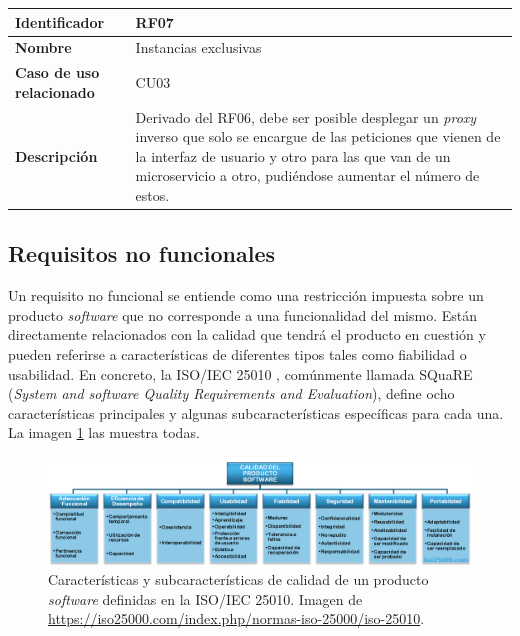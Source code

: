 \documentclass[11pt,spanish,listoffigures]{tfgetsinf}
\begin{document}
\begin{center} \begin{tabular}{| l | p{9.5cm} |}
\hline
\textbf{Identificador} & RF07
\\ \hline
\textbf{Nombre} & Instancias exclusivas
\\ \hline
\textbf{Caso de uso relacionado} & CU03
\\ \hline
\textbf{Descripción} & Derivado del RF06, debe ser posible desplegar un \emph{proxy} inverso que solo se encargue de las peticiones que vienen de la interfaz de usuario y otro para las que van de un microservicio a otro, pudiéndose aumentar el número de estos.
\\ \hline \end{tabular} \end{center}


		\subsection{Requisitos no funcionales} \label{requisitosNoFuncionales}
		
Un requisito no funcional se entiende como una restricción impuesta sobre un producto \emph{software} que no corresponde a una funcionalidad del mismo. Están directamente relacionados con la calidad que tendrá el producto en cuestión y pueden referirse a características de diferentes tipos tales como fiabilidad o usabilidad. En concreto, la ISO/IEC 25010 \cite{ISO25010}, comúnmente llamada SQuaRE (\emph{System and software Quality Requirements and Evaluation}), define ocho características principales y algunas subcaracterísticas específicas para cada una. La imagen \ref{iso25010} las muestra todas.

\begin{figure}[ht]
\centering
\includegraphics[width=1\textwidth]{imagenes/iso25010}
\caption{Características y subcaracterísticas de calidad de un producto \emph{software} definidas en la ISO/IEC 25010. Imagen de \url{https://iso25000.com/index.php/normas-iso-25000/iso-25010}.}
	\label{iso25010}
\end{figure}
\end{document}
